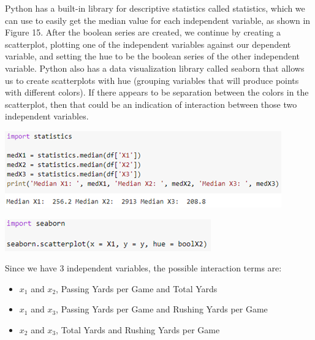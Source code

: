 \documentclass[a4paper,12pt]{report}
\begin{document}
Python has a built-in library for descriptive statistics called statistics, which we can use to easily get the median value for each independent variable, as shown in Figure 15. After the boolean series are created, we continue by creating a scatterplot, plotting one of the independent variables against our dependent variable, and setting the hue to be the boolean series of the other independent variable. Python also has a data visualization library called seaborn that allows us to create scatterplots with hue (grouping variables that will produce points with different colors). If there appears to be separation between the colors in the scatterplot, then that could be an indication of interaction between those two independent variables. 

\begin{center}
    \captionsetup{type=figure}
    \includegraphics[width=.9\linewidth]{media/statMedian.png}
\end{center}

\begin{center}
    \captionsetup{type=figure}
    \includegraphics[width=.9\linewidth]{media/seaborn.png}
\end{center}

Since we have 3 independent variables, the possible interaction terms are:
\begin{itemize}[,]
    \setlength\itemsep{-.1cm}
    \item $x_1$ and $x_2$, Passing Yards per Game and Total Yards
    \item $x_1$ and $x_3$, Passing Yards per Game and Rushing Yards per Game
    \item $x_2$ and $x_3$, Total Yards and Rushing Yards per Game
\end{itemize}
\end{document}
